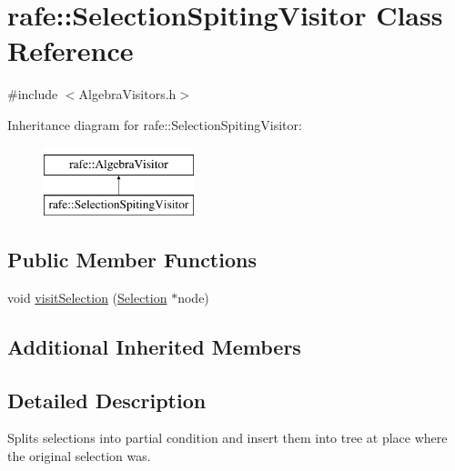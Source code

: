 \hypertarget{classrafe_1_1_selection_spiting_visitor}{\section{rafe\+:\+:Selection\+Spiting\+Visitor Class Reference}
\label{classrafe_1_1_selection_spiting_visitor}
}


{\ttfamily \#include $<$Algebra\+Visitors.\+h$>$}

Inheritance diagram for rafe\+:\+:Selection\+Spiting\+Visitor\+:\begin{figure}[H]
\begin{center}
\leavevmode
\includegraphics[height=2.000000cm]{classrafe_1_1_selection_spiting_visitor}
\end{center}
\end{figure}
\subsection*{Public Member Functions}
\begin{DoxyCompactItemize}
\item 
void \hyperlink{classrafe_1_1_selection_spiting_visitor_a3fe48e9c5e4c511a443d3cc7fe9c49ef}{visit\+Selection} (\hyperlink{classrafe_1_1_selection}{Selection} $\ast$node)
\end{DoxyCompactItemize}
\subsection*{Additional Inherited Members}


\subsection{Detailed Description}
Splits selections into partial condition and insert them into tree at place where the original selection was. 

